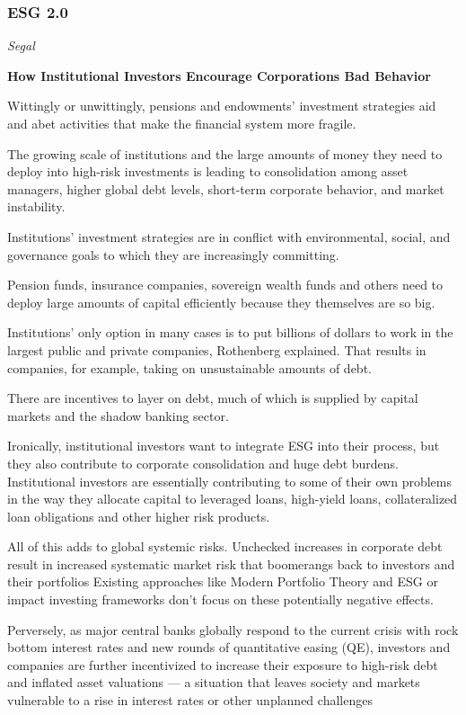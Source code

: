 \documentclass[
]{book}
\begin{document}
\hypertarget{esg-2.0}{%
\subsubsection{ESG 2.0}\label{esg-2.0}}

\emph{Segal}

\textbf{How Institutional Investors Encourage Corporations Bad Behavior}

Wittingly or unwittingly, pensions and endowments' investment strategies aid and abet activities that make the financial system more fragile.

The growing scale of institutions and the large amounts of money they need to deploy into high-risk investments is leading to consolidation among asset managers, higher global debt levels, short-term corporate behavior, and market instability.

Institutions' investment strategies are in conflict with environmental, social, and governance goals to which they are increasingly committing.

Pension funds, insurance companies, sovereign wealth funds and others need to deploy large amounts of capital efficiently because they themselves are so big.

Institutions' only option in many cases is to put billions of dollars to work in the largest public and private companies, Rothenberg explained. That results in companies, for example, taking on unsustainable amounts of debt.

There are incentives to layer on debt, much of which is supplied by capital markets and the shadow banking sector.

Ironically, institutional investors want to integrate ESG into their process, but they also contribute to corporate consolidation and huge debt burdens. Institutional investors are essentially contributing to some of their own problems in the way they allocate capital to leveraged loans, high-yield loans, collateralized loan obligations
and other higher risk products.

All of this adds to global systemic risks.
Unchecked increases in corporate debt result in increased systematic market risk that boomerangs back to investors and their portfolios
Existing approaches like Modern Portfolio Theory and ESG or impact investing frameworks don't focus on these potentially negative effects.

Perversely, as major central banks globally respond to the current crisis with rock bottom interest rates and new rounds of quantitative easing (QE), investors and companies are further incentivized to increase their exposure to high-risk debt and inflated asset valuations --- a situation that leaves society and markets vulnerable to a rise in interest rates or other unplanned challenges
\end{document}
